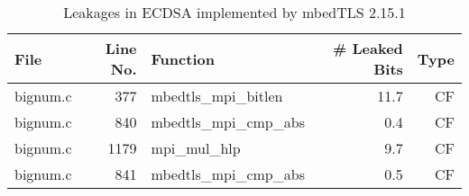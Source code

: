 \begin{table}[h!]
\centering\tiny\scriptsize
\caption{Leakages in ECDSA implemented by mbedTLS 2.15.1}\label{tab:t_ECDSALibgcrypt2.15.1-nonce}
\begin{tabular}{lrlrr}
\hline
\textbf{File} & \textbf{Line No.} & \textbf{Function} & \textbf{\# Leaked Bits} & \textbf{Type} \\\hline
bignum.c& 377&mbedtls\_mpi\_bitlen&11.7 &CF\\
bignum.c& 840&mbedtls\_mpi\_cmp\_abs&0.4 &CF\\
bignum.c& 1179&mpi\_mul\_hlp&9.7 &CF\\
bignum.c& 841&mbedtls\_mpi\_cmp\_abs&0.5 &CF\\
\hline
\end{tabular}
\renewcommand{\baselinestretch}{1.0}\selectfont
\end{table}
